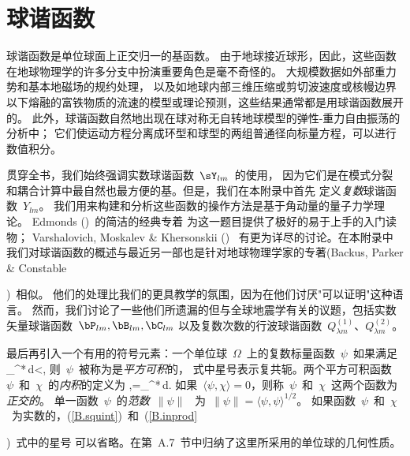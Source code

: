 \chapter{球谐函数}
\label{chapter:sh}

球谐函数是单位球面上正交归一的基函数。
由于地球接近球形，因此，这些函数在地球物理学的许多分支中扮演重要角色是毫不奇怪的。 大规模数据如外部重力势和基本地磁场的规约处理，
以及如地球内部三维压缩或剪切波速度或核幔边界以下熔融的富铁物质的流速的模型或理论预测，这些结果通常都是用球谐函数展开的。
此外，球谐函数自然地出现在球对称无自转地球模型的弹性-重力自由振荡的分析中；
它们使运动方程分离成环型和球型的两组普通径向标量方程，可以进行数值积分。

贯穿全书，我们始终强调实数球谐函数~$\sY_{lm}$~的使用，
%
%
因为它们是在模式分裂和耦合计算中最自然也最方便的基。但是，我们在本附录中首先
定义{\em 复数\/}球谐函数~$Y_{lm}$。
%
%
我们用来构建和分析这些函数的操作方法是基于角动量的量子力学理论。
Edmonds (\citeyear{edmonds60})~的简洁的经典专着
为这一题目提供了极好的易于上手的入门读物；
Varshalovich, Moskalev \& Khersonskii (\citeyear{varshalovich&al88})~ 有更为详尽的讨论。在本附录中我们对球谐函数的概述与最近另一部也是针对地球物理学家的专著(Backus, Parker \& Constable {\citeyear{backus&al96})~相似。
他们的处理比我们的更具教学的氛围，因为在他们讨厌"可以证明"这种语言。
然而，我们讨论了一些他们所遗漏的但与全球地震学有关的议题，包括实数矢量球谐函数~$\bP_{lm},\bB_{lm},\bC_{lm}$ \vspace{-0.2 ex}
以及复数次数的行波球谐函数~$Q_{\lambda m}^{(1)}$、$Q_{\lambda m}^{(2)}$。

最后再引入一个有用的符号元素：一个单位球~$\Omega$~上的复数标量函数~$\psi$~如果满足
\eq \label{B.squint}
\int_{\Omega}\psi^*\psi\,d\/\Omega<\infty,
\en
则~$\psi$~被称为是{\em 平方可积\/}的，
%
式中星号表示复共轭。两个平方可积函数~$\psi$~和~$\chi$~的{\em 内积\/}的定义为
%
\eq
\label{B.inprod}
\langle\psi,\chi\rangle=\int_\Omega \psi^*\chi\,d\Om.
\en
如果~$\langle\psi,\chi\rangle=0$，则称~$\psi$~和~$\chi$~这两个函数为{\em 正交的\/}。
%
单一函数~$\psi$~的{\em 范数\/}~$\|\psi\|$~
%
为~$\|\psi\|=\langle\psi, \psi\rangle^{1/2}$。
如果函数~$\psi$~和~$\chi$~为实数的，(\ref{B.squint})~和~(\ref{B.inprod}})~式中的星号
可以省略。在第~A.7~节中归纳了这里所采用的单位球的几何性质。

